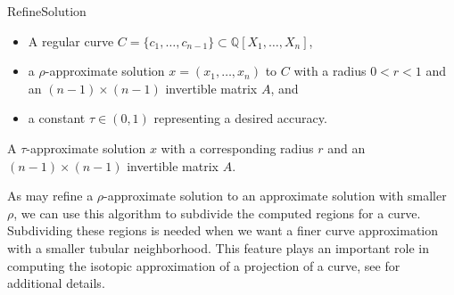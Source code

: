 \begin{algorithm}[ht]
	\caption{RefineSolution}
 \label{algo:meta_refine}
\begin{algorithmic}[1]
\Require  
\begin{itemize}
    \item A regular curve $C=\{c_1,\dots, c_{n-1}\}\subset\mathbb{Q}[X_1,\dots,X_n]$,
    \item a $\rho$-approximate solution $x=(x_1,\dots, x_n)$ to $C$ with a radius $0<r<1$ and an $(n-1)\times (n-1)$ invertible matrix $A$, and
    \item a constant $\tau\in (0,1)$ representing a desired accuracy.
\end{itemize}
\Ensure A $\tau$-approximate solution $x$ with a corresponding radius $r$ and an $(n-1)\times (n-1)$ invertible matrix $A$.
\EndWhile
{}\label{line:while_loop_in_Refine}
\EndWhile
{}
 \end{algorithmic}
 \end{algorithm}

As  may refine a $\rho$-approximate solution to an approximate solution with smaller $\rho$, we can use this algorithm to subdivide the computed regions for a curve. Subdividing these regions is needed when we want a finer curve approximation with a smaller tubular neighborhood. This feature plays an important role in computing the isotopic approximation of a projection of a curve, see  for additional details.

